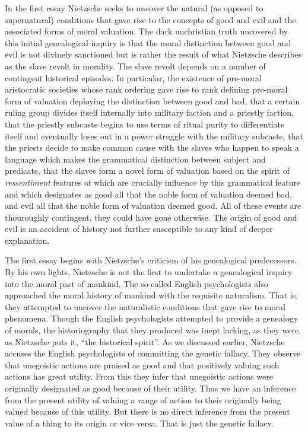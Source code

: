 
In the first essay Nietzsche seeks to uncover the natural (as opposed to supernatural) conditions that gave rise to the concepts of good and evil and the associated forms of moral valuation. The dark unchristian truth uncovered by this initial genealogical inquiry is that the moral distinction between good and evil is not divinely sanctioned but is rather the result of what Nietzsche describes as the slave revolt in morality. The slave revolt depends on a number of contingent historical episodes. In particular, the existence of pre-moral aristocratic societies whose rank ordering gave rise to rank defining pre-moral form of valuation deploying the distinction between good and bad, that a certain ruling group divides itself internally into military faction and a priestly faction, that the priestly subcaste begins to use terms of ritual purity to differentiate itself and eventually loses out in a power struggle with the military subcaste, that the priests decide to make common cause with the slaves who happen to speak a language which makes the grammatical distinction between subject and predicate, that the slaves form a novel form of valuation based on the spirit of \emph{ressentiment} features of which are crucially influence by this grammatical feature and which designates as good all that the noble form of valuation deemed bad, and evil all that the noble form of valuation deemed good. All of these events are thouroughly contingent, they could have gone otherwise. The origin of good and evil is an accident of history not further susceptible to any kind of deeper explanation.

The first essay begins with Nietzsche's criticism of his genealogical predecessors. By his own lights, Nietzsche is not the first to undertake a genealogical inquiry into the moral past of mankind. The so-called English psychologists also approached the moral history of mankind with the requisite naturalism. That is, they attempted to uncover the naturalistic conditions that gave rise to moral phenomena. Though the English psychologists attempted to provide a genealogy of morals, the historiography that they produced was inept lacking, as they were, as Nietzsche puts it, ``the historical spirit''. As we discussed earlier, Nietzsche accuses the English psychologists of committing the genetic fallacy. They observe that unegoistic actions are praised as good and that positively valuing such actions has great utility. From this they infer that unegoistic actions were originally designated as good because of their utility. Thus we have an inference from the present utility of valuing a range of action to their originally being valued because of this utility. But there is no direct inference from the present value of a thing to its origin or vice versa. That is just the genetic fallacy.


